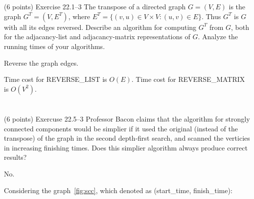 \documentclass[paper=a4, fontsize=11pt]{scrartcl} %
\begin{document}
\section{}

\begin{fancyquotes}
  (6 points) Exercise 22.1--3 The transpose of a directed graph
  $G=(V,E)$ is the graph $G^T=(V,E^T)$, where $E^T=\{(v,u)\in V\times
  V : (u,v)\in E\}$. Thus $G^T$ is $G$ with all its edges
  reversed. Describe an algorithm for computing $G^T$ from $G$, both
  for the adjacancy-list and adjacancy-matrix representations of
  $G$. Analyze the running times of your algorithms.
\end{fancyquotes}

\begin{algorithm}[H]
  \caption{Reverse the graph edges.}
\end{algorithm}

Time cost for \textsc{REVERSE\_LIST} is $O(E)$.
Time cost for \textsc{REVERSE\_MATRIX} is $O(V^2)$.

\pagebreak

\section{}

\begin{fancyquotes}
  (6 points) Exercuse 22.5--3 Professor Bacon claims that the algorithm
  for strongly connected components would be simplier if it used the
  original (instead of the transpose) of the graph in the second
  depth-first search, and scanned the verticies in increasing
  finishing times. Does this simplier algorithm always produce correct
  results?
\end{fancyquotes}

No.

Considering the graph~\ref{fig:scc}, which denoted as (start\_time, finish\_time):
\end{document}
